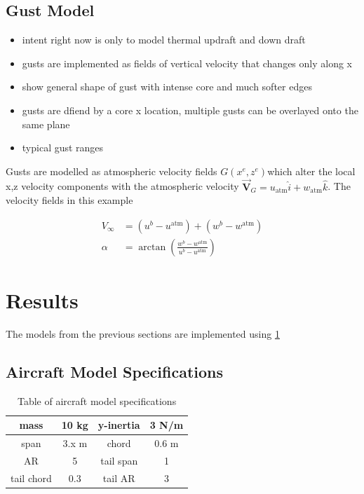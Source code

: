 \documentclass[]{article}
\begin{document}
	
	\subsection{Gust Model} \label{sec:gust-model}
	\begin{itemize}
		\item intent right now is only to model thermal updraft and down draft
		\item gusts are implemented as fields of vertical velocity that changes only along x
		\item show general shape of gust with intense core and much softer edges
		\item gusts are dfiend by a core x location, multiple gusts can be overlayed onto the same plane
		\item typical gust ranges
	\end{itemize}
	
	Gusts are modelled as atmospheric velocity fields $G\left( x^e, z^e \right)$which alter the local x,z velocity components with the atmospheric velocity $\vec{\mathbf{V}}_G = u_\mathrm{atm}\hat{i} + w_\mathrm{atm}\hat{k}$. 
	The velocity fields in this example 
	
	\begin{align}
		V_\infty &= \left( u^b - u^\mathrm{atm}\right) + \left(w^b - w^\mathrm{atm}\right)\\
		\alpha &= \arctan\left( \frac{w^b - w^\mathrm{atm}}{u^b - u^\mathrm{atm}} \right)
	\end{align}
	
	\section{Results}
		
	The models from the previous sections are implemented using \cref{tbl:aircraft-specs}
		\subsection{Aircraft Model Specifications}
	\begin{table}[!h]
		\centering
		\caption{Table of aircraft model specifications}\label{tbl:aircraft-specs}
		\begin{tabular}{|c||c|c||c|}
			\hline 
			mass & 10 kg & y-inertia & 3 N/m \\
			\hline 
			span & 3.x m & chord  & 0.6 m \\
			\hline 
			AR & 5 & tail span & 1 \\
			\hline
			tail chord & 0.3 & tail AR & 3 \\
			\hline
			
		\end{tabular}
	\end{table}
\end{document}
